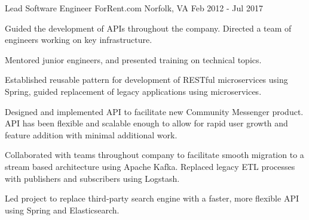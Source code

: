 
\begin{cventries}

  \cventry
  {Lead Software Engineer} %
  {ForRent.com} %
  {Norfolk, VA} %
  {Feb 2012 - Jul 2017} %
  {
    \begin{cvitems} %
      \item {Guided the development of APIs throughout the company. Directed a team of engineers
      working on key infrastructure.}
      \item {Mentored junior engineers, and presented training on technical topics.}
      \item {Established reusable pattern for development of RESTful microservices using Spring,
      guided replacement of legacy applications using microservices.}
      \item {Designed and implemented API to facilitate new Community Messenger product. API has
      been flexible and scalable enough to allow for rapid user growth and feature addition with
      minimal additional work.}
      \item {Collaborated with teams throughout company to facilitate smooth migration to a stream
      based architecture using Apache Kafka. Replaced legacy ETL processes with publishers and
      subscribers using Logstash.}
      \item {Led project to replace third-party search engine with a faster, more flexible API using
      Spring and Elasticsearch.}
    \end{cvitems}
  }


\end{cventries}
